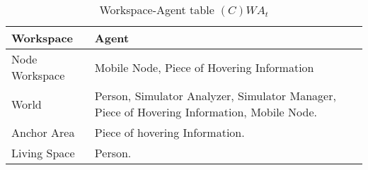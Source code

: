\begin{table}[H]
	\centering
	\begin{tabular}{|p{4cm}|p{8cm}|}
			\hline
			\textbf{Workspace} & \textbf{Agent} \\
			\hline
			Node Workspace & Mobile Node, Piece of Hovering Information \\
			\hline
			World & Person, Simulator Analyzer, Simulator Manager, Piece of Hovering
			Information, Mobile Node. \\
			\hline
			Anchor Area & Piece of hovering Information. \\
			\hline
			Living Space & Person. \\
			\hline
		\end{tabular}
	\caption{Workspace-Agent table $(C)WA_t$}
	\label{tab:cwat}
\end{table}
